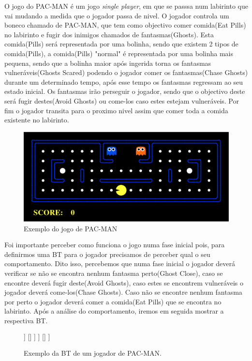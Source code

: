 O jogo do PAC-MAN é um jogo \textit{single player}, em que se passsa num labirinto que vai mudando a medida que o jogador passa de nivel. O jogador controla um boneco chamado de PAC-MAN, que tem como objectivo comer comida(Eat Pills) no labirinto e fugir dos inimigos chamados de fantasmas(Ghosts). Esta comida(Pills) será representada por uma bolinha, sendo que existem 2 tipos de comida(Pills), a comida(Pills) "normal" é representada por uma bolinha mais pequena, sendo que a bolinha maior após ingerida torna os fantasmas vulneráveis(Ghosts Scared) podendo o jogador comer os fantasmas(Chase Ghosts) durante um determinado tempo, após esse tempo os fantasmas regressam ao seu estado inicial. Os fantasmas irão perseguir o jogador, sendo que o objectivo deste será fugir destes(Avoid Ghosts) ou come-los caso estes estejam vulneráveis. Por fim o jogador transita para o proximo nivel assim que comer toda a comida existente no labirinto.

\begin{figure}[h!]
\centering
\includegraphics[scale=0.5]{Figures/PACMAN.PNG}
\caption{Exemplo do jogo de PAC-MAN}
\label{fig:traducao}
\end{figure}

Foi importante perceber como funciona o jogo numa fase inicial pois, para definirmos uma BT para o jogador precisamos de perceber qual o seu comportamento. Dito isso, percebemos que numa fase inicial o jogador deverá verificar se não se encontra nenhum fantasma perto(Ghost Close), caso se encontre deverá fugir deste(Avoid Ghosts), caso estes se encontrem vulneráveis o jogador deverá come-los(Chase Ghosts). Caso não se encontre nenhum fantasma por perto o jogador deverá comer a comida(Eat Pills) que se encontra no labirinto. Após a análise do comportamento, iremos em seguida mostrar a respectiva BT.


        \begin{figure}[H]
        \centering
        \begin{behavior}
            [\selector
                [\sequence
                    [\condition{Ghost Close}]
                    [\selector
                        [\sequence
                            [\condition{Ghost Scared}]
                            [\action{Chase Ghost}]
                        ]
                        []
                    ]
                ]
                []
            ]
        \end{behavior}
        \caption{Exemplo da BT de um jogador de PAC-MAN.}
        \label{fig:2.9}
        \end{figure}